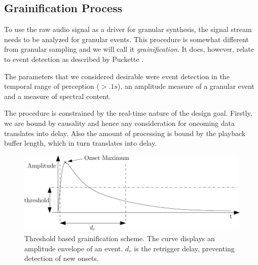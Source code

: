 \subsection{Grainification Process}

To use the raw audio signal as a driver for granular synthesis, the
signal stream needs to be analyzed for granular events. This procedure
is somewhat different from granular sampling and we will call it {\em
grainification}. It does, however, relate to event detection as described by
Puckette \cite{Puckette:2003}.

The parameters that we considered desirable were event detection in the
temporal range of perception ($>.1 s$), an amplitude measure of a
granular event and a measure of spectral content.

The procedure is constrained by the real-time nature of the design
goal. Firstly, we are bound by causality and hence any consideration
for oncoming data translates into delay. Also the amount of processing
is bound by the playback buffer length, which in turn translates into
delay. 

\begin{figure}[t]
\centering
\includegraphics[width=\textwidth]{GrainThres4-eps-converted-to.pdf}
\caption{Threshold based grainification scheme. The curve displays an amplitude envelope of an event. $d_r$ is the retrigger delay, preventing detection of new onsets.}\label{Omodhrain:fig:grainenv}
\end{figure}

